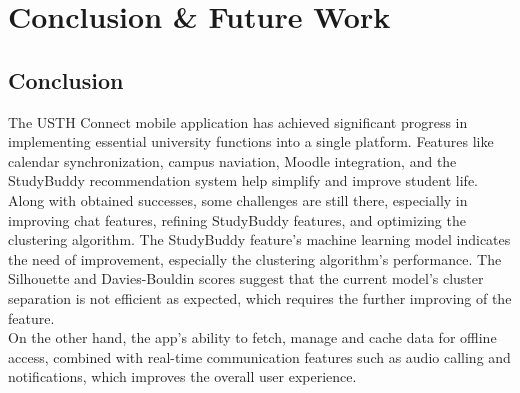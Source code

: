 \documentclass[12pt]{article}
\begin{document}

\section{Conclusion {\&} Future Work}
\subsection{Conclusion}
The USTH Connect mobile application has achieved significant progress in implementing essential university functions into a single platform. Features like calendar synchronization, campus naviation, Moodle integration, and the StudyBuddy recommendation system help simplify and improve student life.
Along with obtained successes, some challenges are still there, especially in improving chat features, refining StudyBuddy features, and optimizing the clustering algorithm.
The StudyBuddy feature's machine learning model indicates the need of improvement, especially the clustering algorithm's performance. The Silhouette and Davies-Bouldin scores suggest that the current model's cluster separation is not efficient as expected, which requires the further improving of the feature. \\

On the other hand, the app's ability to fetch, manage and cache data for offline access, combined with real-time communication features such as audio calling and notifications, which improves the overall user experience.
\end{document}
